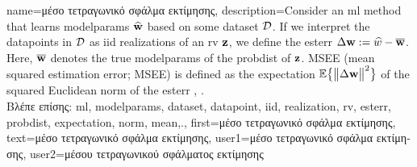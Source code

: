 
{name={\foreignlanguage{greek}{μέσο τετραγωνικό σφάλμα εκτίμησης}},
	description={Consider an \gls{ml} method that 
		learns \gls{modelparams} $\widehat{{\bf w}}$ based on some \gls{dataset} $\mathcal{D}$. 
		If we interpret the \gls{datapoint}s in $\mathcal{D}$ as \gls{iid} \gls{realization}s of an \gls{rv} ${\bf z}$, 
		we define the \gls{esterr} $\Delta {\bf w} := \widehat{w} - \overline{{\bf w}}$. 
		Here, $\overline{{\bf w}}$ denotes the true \gls{modelparams} of the \gls{probdist} 
		of ${\bf z}$. MSEE (mean squared estimation error; MSEE) is 
		defined as the \gls{expectation} $\mathbb{E} \big\{ \big\| \Delta {\bf w} \big\|^{2} \big\}$ of the 
		squared Euclidean \gls{norm} of the \gls{esterr} \cite{LC}, \cite{kay}.\\
		\foreignlanguage{greek}{Βλέπε επίσης:} \gls{ml}, \gls{modelparams}, \gls{dataset}, \gls{datapoint}, \gls{iid}, \gls{realization}, \gls{rv}, \gls{esterr}, \gls{probdist}, \gls{expectation}, \gls{norm},  \gls{mean},.},
	first={\foreignlanguage{greek}{μέσο τετραγωνικό σφάλμα εκτίμησης}},
	text={\foreignlanguage{greek}{μέσο τετραγωνικό σφάλμα εκτίμησης}},
	user1={\foreignlanguage{greek}{μέσο τετραγωνικό σφάλμα εκτίμησης}}, %
    	user2={\foreignlanguage{greek}{μέσου τετραγωνικού σφάλματος εκτίμησης}} %
}


